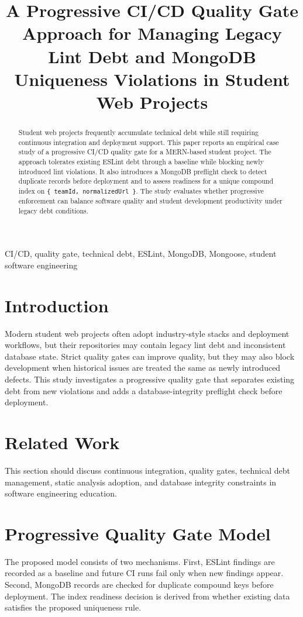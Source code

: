 \documentclass[conference]{IEEEtran}
\title{A Progressive CI/CD Quality Gate Approach for Managing Legacy Lint Debt and MongoDB Uniqueness Violations in Student Web Projects}
\author{
\IEEEauthorblockN{Author Name}
\IEEEauthorblockA{
Department or University\\
Email
}
}
\begin{document}
\maketitle

\begin{abstract}
Student web projects frequently accumulate technical debt while still requiring continuous integration and deployment support. This paper reports an empirical case study of a progressive CI/CD quality gate for a MERN-based student project. The approach tolerates existing ESLint debt through a baseline while blocking newly introduced lint violations. It also introduces a MongoDB preflight check to detect duplicate records before deployment and to assess readiness for a unique compound index on \texttt{\{ teamId, normalizedUrl \}}. The study evaluates whether progressive enforcement can balance software quality and student development productivity under legacy debt conditions.
\end{abstract}

\begin{IEEEkeywords}
CI/CD, quality gate, technical debt, ESLint, MongoDB, Mongoose, student software engineering
\end{IEEEkeywords}

\section{Introduction}
Modern student web projects often adopt industry-style stacks and deployment workflows, but their repositories may contain legacy lint debt and inconsistent database state. Strict quality gates can improve quality, but they may also block development when historical issues are treated the same as newly introduced defects. This study investigates a progressive quality gate that separates existing debt from new violations and adds a database-integrity preflight check before deployment.

\section{Related Work}
This section should discuss continuous integration, quality gates, technical debt management, static analysis adoption, and database integrity constraints in software engineering education.

\section{Progressive Quality Gate Model}
The proposed model consists of two mechanisms. First, ESLint findings are recorded as a baseline and future CI runs fail only when new findings appear. Second, MongoDB records are checked for duplicate compound keys before deployment. The index readiness decision is derived from whether existing data satisfies the proposed uniqueness rule.
\end{document}
